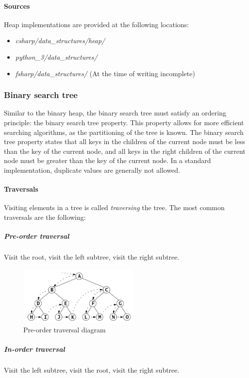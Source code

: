 \documentclass{article}
\begin{document}
\paragraph{Sources}
Heap implementations are provided at the following locations:
\begin{itemize}
\item{{\em csharp/data\_structures/heap/}}
\item{{\em python\_3/data\_structures/}}
\item{{\em fsharp/data\_structures/} (At the time of writing incomplete)}
\end{itemize}


\subsubsection{Binary search tree}
Similar to the binary heap, the binary search tree must satisfy an ordering principle:
the binary search tree property. This property allows for more efficient searching algorithms,
as the partitioning of the tree is known. The binary search tree property states that all keys in the
children of the current node must be less than the key of the current node, and all keys in the right
children of the current node must be greater than the key of the current node.
In a standard implementation, duplicate values are generally not allowed.


\newpage


\paragraph{Traversals}
Visiting elements in a tree is called {\em traversing} the tree. The most common traversals are the following:

\subparagraph{Pre-order traversal}
Visit the root, visit the left subtree, visit the right subtree.

\begin{figure}[H]
  \centering
  \includegraphics[width=6cm]{pre_order_traversal}
  \caption{Pre-order traversal diagram}
\end{figure}

\subparagraph{In-order traversal}
Visit the left subtree, visit the root, visit the right subtree.
\end{document}
